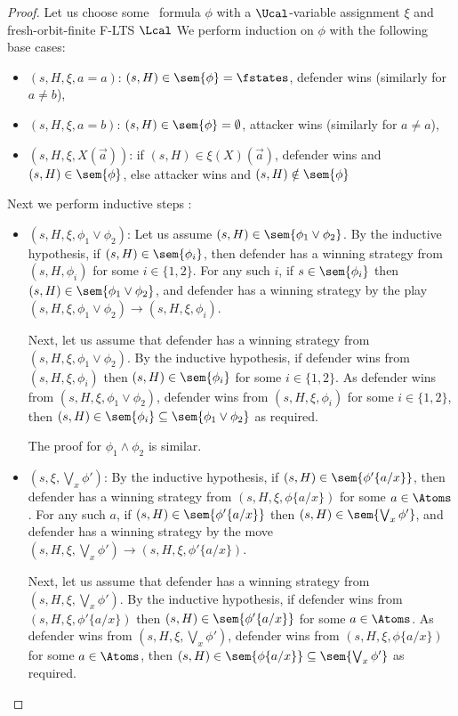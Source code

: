 \begin{proof}
	Let us choose some \fhml\ formula $\phi$ with a $\Ucal$-variable assignment $\xi$ and fresh-orbit-finite F-LTS $\Lcal$
	We perform 
	induction on $\phi$ with the following base cases:
	\begin{itemize}
		\item $(s, H, \xi, a = a)$: $(s, H)\in\sem{\phi} = \fstates$, defender wins (similarly for $a \neq b$),
		\item $(s, H, \xi, a = b)$: $(s, H)\in\sem{\phi} = \emptyset$, attacker wins (similarly for $a \neq a$),
		\item $(s, H, \xi, X(\vec a))$: if $(s, H)\in \xi(X)(\vec a)$, defender wins and $(s, H) \in \sem{\phi}$, else attacker wins and $(s, H)\notin \sem{\phi}$
	\end{itemize}
	Next we perform inductive steps :
	\begin{itemize}
		\item $(s, H, \xi, \phi_1 \lor \phi_2)$:
		Let us assume $(s, H) \in \sem{\phi_1 \lor \phi_2}$.
		By the inductive hypothesis, if $(s, H) \in \sem{\phi_i}$, then defender has a winning strategy from $(s, H, \phi_i)$ for some $i \in \{1, 2\}$. 
		For any such $i$, if $s \in \sem{\phi_i}$ then $(s, H)\in \sem{\phi_1 \lor \phi_2}$, and defender has a winning strategy by the play $
		(s, H, \xi, \phi_1 \lor \phi_2) \rightarrow (s, H, \xi, \phi_i)$.
		
		Next, let us assume that defender has a winning strategy from $(s, H, \xi, \phi_1 \lor \phi_2)$. 
		By the inductive hypothesis, if defender wins from $(s, H, \xi, \phi_i)$ then $(s, H)\in \sem{\phi_i}$ for some $i \in \{1, 2\}$.
		As defender wins from $(s, H, \xi, \phi_1 \lor \phi_2)$, defender wins from $(s, H, \xi, \phi_i)$ for some $i \in \{1, 2\}$, then $(s, H) \in \sem{\phi_i} \subseteq \sem{\phi_1 \lor \phi_2}$ as required.
		
		The proof for $\phi_1 \land \phi_2$ is similar.
				\item $(s, \xi, \bigvee_x \phi')$: 
		By the inductive hypothesis, if $(s, H)\in \sem{\phi'\{a/x\}}$, then defender has a winning strategy from $(s, H, \xi, \phi\{a/x\})$ for some $a \in \Atoms$.
		For any such $a$, if $(s, H)\in \sem{\phi'\{a/x\}}$ then $(s, H) \in \sem{\bigvee_x \phi'}$, and defender has a winning strategy by the move $(s, H, \xi, \bigvee_x \phi') \rightarrow (s, H, \xi, \phi'\{a/x\})$.
		
		Next, let us assume that defender has a winning strategy from $(s, H, \xi, \bigvee_x \phi')$. 
		By the inductive hypothesis, if defender wins from $(s, H, \xi, \phi'\{a/x\})$ then $(s, H) \in \sem{\phi'\{a/x\}}$ for some $a \in \Atoms$.
		As defender wins from $(s, H, \xi, \bigvee_x \phi')$, defender wins from $(s, H, \xi, \phi\{a/x\})$ for some $a \in \Atoms$, then $(s, H) \in \sem{\phi\{a/x\}} \subseteq \sem{\bigvee_x \phi'}$ as required.
		

\end{itemize}
\end{proof}
